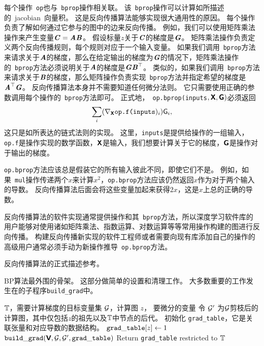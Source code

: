 每个操作~\verb|op|也与~\verb|bprop|操作相关联。
该~\verb|bprop|操作可以计算如所描述的~\gls{jacobian}~向量积。
这是反向传播算法能够实现很大通用性的原因。
每个操作负责了解如何通过它参与的图中的边来反向传播。
例如，我们可以使用矩阵乘法操作来产生变量$\boldsymbol{\mathit{C}}=\boldsymbol{\mathit{A}}\boldsymbol{\mathit{B}}$。
假设标量$z$关于$\boldsymbol{\mathit{C}}$的梯度是$\boldsymbol{\mathit{G}}$。
矩阵乘法操作负责定义两个反向传播规则，每个规则对应于一个输入变量。
如果我们调用~\verb|bprop|方法来请求关于$\boldsymbol{\mathit{A}}$的梯度，那么在给定输出的梯度为$\boldsymbol{\mathit{G}}$的情况下，矩阵乘法操作的~\verb|bprop|方法必须说明关于$\boldsymbol{\mathit{A}}$的梯度是$\boldsymbol{\mathit{G}}\boldsymbol{\mathit{B}}^\top$。
类似的，如果我们调用~\verb|bprop|方法来请求关于$\boldsymbol{\mathit{B}}$的梯度，那么矩阵操作负责实现~\verb|bprop|方法并指定希望的梯度是$\boldsymbol{\mathit{A}}^\top\boldsymbol{\mathit{G}}$。
反向传播算法本身并不需要知道任何微分法则。
它只需要使用正确的参数调用每个操作的~\verb|bprop|方法即可。
正式地，~\verb|op.bprop(inputs|$, \textsf{\textbf{X}}, \textsf{\textbf{G}})$必须返回
\begin{equation}
  \sum_i (\nabla_{\TSX} \verb|op.f(inputs|)_i) \textsf{G}_i,
\end{equation}
这只是如所表达的链式法则的实现。
这里，\verb|inputs|是提供给操作的一组输入，\verb|op.f|是操作实现的数学函数，$\textsf{\textbf{X}}$是输入，我们想要计算关于它的梯度，$\textsf{\textbf{G}}$是操作对于输出的梯度。

\verb|op.bprop|方法应该总是假装它的所有输入彼此不同，即使它们不是。
例如，如果~\verb|mul|操作传递两个$x$来计算$x^2$，\verb|op.bprop|方法应该仍然返回$x$作为对于两个输入的导数。
反向传播算法后面会将这些变量加起来获得$2x$，这是$x$上总的正确的导数。

反向传播算法的软件实现通常提供操作和其~\verb|bprop|方法，所以深度学习软件库的用户能够对使用诸如矩阵乘法、指数运算、对数运算等等常用操作构建的图进行反向传播。
构建反向传播新实现的软件工程师或者需要向现有库添加自己的操作的高级用户通常必须手动为新操作推导~\verb|op.bprop|方法。

反向传播算法的正式描述参考。

\begin{algorithm}[ht]
\caption{\gls{BP}算法最外围的骨架。
这部分做简单的设置和清理工作。
大多数重要的工作发生在的子程序{\tt build\_grad}中。
}
\label{alg:backprop}
\begin{algorithmic}
\REQUIRE $\mathbb{T}$，需要计算梯度的目标变量集
\REQUIRE $\mathcal{G}$，计算图
\REQUIRE $z$， 要微分的变量
\STATE 令 $\mathcal{G}'$ 为$\mathcal{G}$剪枝后的计算图，其中仅包括$z$的祖先以及$\mathbb{T}$中节点的后代。
\STATE 初始化 {\tt grad\_table}，它是关联张量和对应导数的数据结构。
\STATE ${\tt grad\_table}[z] \leftarrow 1$
\STATE ${\tt build\_grad}(\textsf{\textbf{V}}, \mathcal{G}, \mathcal{G}', {\tt grad\_table})$
\ENDFOR
\STATE Return {\tt grad\_table} restricted to $\mathbb{T}$
\end{algorithmic}
\end{algorithm}

